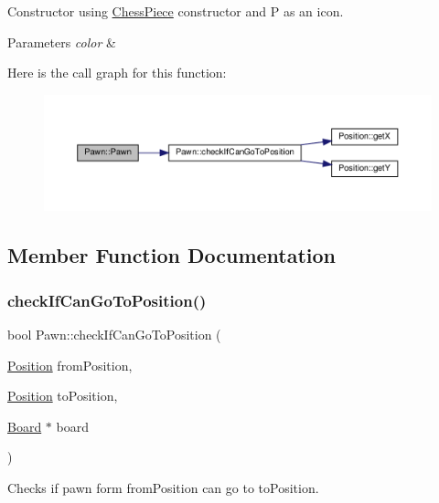 Constructor using \hyperlink{classChessPiece}{Chess\+Piece} constructor and \textquotesingle{}P\textquotesingle{} as an icon. 


\begin{DoxyParams}{Parameters}
{\em color} & \\
\hline
\end{DoxyParams}
Here is the call graph for this function\+:
\nopagebreak
\begin{figure}[H]
\begin{center}
\leavevmode
\includegraphics[width=350pt]{classPawn_a3e1ac517cf828f52957f54179a455922_cgraph}
\end{center}
\end{figure}


\subsection{Member Function Documentation}
\mbox{\label{classPawn_a30abb1fc67dffcd5f9ae104baf3e27ac}} 
\subsubsection{\texorpdfstring{check\+If\+Can\+Go\+To\+Position()}{checkIfCanGoToPosition()}}
{\footnotesize\ttfamily bool Pawn\+::check\+If\+Can\+Go\+To\+Position (\begin{DoxyParamCaption}\item[{\hyperlink{classPosition}{Position}}]{from\+Position,  }\item[{\hyperlink{classPosition}{Position}}]{to\+Position,  }\item[{\hyperlink{classBoard}{Board} $\ast$}]{board }\end{DoxyParamCaption})\hspace{0.3cm}{\ttfamily [virtual]}}



Checks if pawn form from\+Position can go to to\+Position. 


